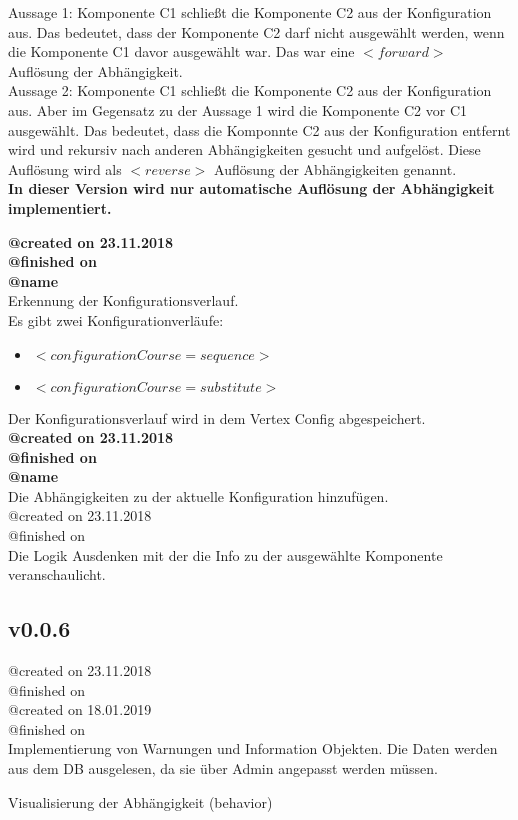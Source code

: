 \documentclass{article}
\begin{document}
Aussage 1: Komponente C1 schließt die Komponente C2 aus der Konfiguration aus. Das bedeutet, dass
der Komponente C2 darf nicht ausgewählt werden, wenn die Komponente C1 davor ausgewählt war. Das war 
eine $<forward>$ Auflösung der Abhängigkeit.\\

Aussage 2: Komponente C1 schließt die Komponente C2 aus der Konfiguration aus. 
Aber im Gegensatz zu der Aussage 1 wird die Komponente C2 vor C1 ausgewählt. Das bedeutet, 
dass die Komponnte C2 aus der Konfiguration entfernt wird und rekursiv nach 
anderen Abhängigkeiten gesucht und aufgelöst. Diese Auflösung wird als $<reverse>$ Auflösung 
der Abhängigkeiten genannt.\\

\textbf{In dieser Version wird nur automatische Auflösung der Abhängigkeit implementiert.}

\noindent\textbf{@created on 23.11.2018}\\
\textbf{@finished on }\\
\textbf{@name }\\

\noindent Erkennung der Konfigurationsverlauf.\\
Es gibt zwei Konfigurationverläufe: 

\begin{itemize}
	\item $<configurationCourse=sequence>$
	\item $<configurationCourse=substitute>$
\end{itemize}
\noindent Der Konfigurationsverlauf wird in dem Vertex Config abgespeichert. \\

\noindent \textbf{@created on 23.11.2018}\\
\textbf{@finished on }\\
\textbf{@name}\\

\noindent Die Abhängigkeiten zu der aktuelle Konfiguration hinzufügen.\\

\noindent @created on 23.11.2018\\
@finished on \\
Die Logik Ausdenken mit der die Info zu der ausgewählte Komponente veranschaulicht.\\

\subsection{v0.0.6}

\noindent @created on 23.11.2018\\
@finished on \\

\noindent @created on 18.01.2019\\
@finished on \\
Implementierung von Warnungen und Information Objekten. Die Daten werden aus dem DB
ausgelesen, da sie über Admin angepasst werden müssen.

Visualisierung der Abhängigkeit (behavior)
\end{document}
